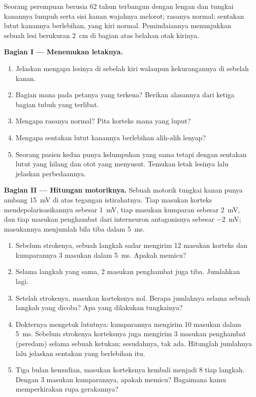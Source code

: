 \begin{problem}
\label{pb:g12:brain-and-movement:1}
Seorang perempuan berusia 62 tahun terbangun dengan lengan dan tungkai
kanannya lumpuh serta sisi kanan wajahnya melorot; rasanya normal;
sentakan lutut kanannya berlebihan, yang kiri normal. Pemindaiannya
menunjukkan sebuah lesi berukuran \qty{2}{cm} di bagian atas belahan
otak kirinya.

\medskip
\noindent\textbf{Bagian I --- Menemukan letaknya.}
\begin{enumerate}
  \item Jelaskan mengapa lesinya di sebelah kiri walaupun
        kekurangannya di sebelah kanan.
  \item Bagian mana pada petanya yang terkena? Berikan alasannya dari
        ketiga bagian tubuh yang terlibat.
  \item Mengapa rasanya normal? Pita korteks mana yang luput?
  \item Mengapa sentakan lutut kanannya berlebihan alih-alih lenyap?
  \item Seorang pasien kedua punya kelumpuhan yang sama tetapi dengan
        sentakan lutut yang hilang dan otot yang menyusut. Temukan
        letak lesinya lalu jelaskan perbedaannya.
\end{enumerate}

\medskip
\noindent\textbf{Bagian II --- Hitungan  motoriknya.}
Sebuah  motorik tungkai kanan punya ambang \qty{15}{mV} di atas
tegangan istirahatnya. Tiap masukan korteks mendepolarisasikannya
sebesar \qty{1}{mV}, tiap masukan kumparan sebesar \qty{2}{mV}, dan
tiap masukan penghambat dari interneuron antagonisnya sebesar
\qty{-2}{mV}; masukannya menjumlah bila tiba dalam \qty{5}{ms}.
\begin{enumerate}[resume]
  \item Sebelum strokenya, sebuah langkah sadar mengirim 12 masukan
        korteks dan kumparannya 3 masukan dalam \qty{5}{ms}. Apakah
         memicu?
  \item Selama langkah yang sama, 2 masukan penghambat juga tiba.
        Jumlahkan lagi.
  \item Setelah strokenya, masukan korteksnya nol. Berapa jumlahnya
        selama sebuah langkah yang dicoba? Apa yang dilakukan
        tungkainya?
  \item Dokternya mengetuk lututnya: kumparannya mengirim 10 masukan
        dalam \qty{5}{ms}. Sebelum strokenya korteksnya juga mengirim 3
        masukan penghambat (peredam) selama sebuah ketukan; sesudahnya,
        tak ada. Hitunglah jumlahnya lalu jelaskan sentakan yang
        berlebihan itu.
  \item Tiga bulan kemudian, masukan korteksnya kembali menjadi 8 tiap
        langkah. Dengan 3 masukan kumparannya, apakah  memicu?
        Bagaimana kamu memperkirakan rupa gerakannya?
\end{enumerate}


\end{problem}
